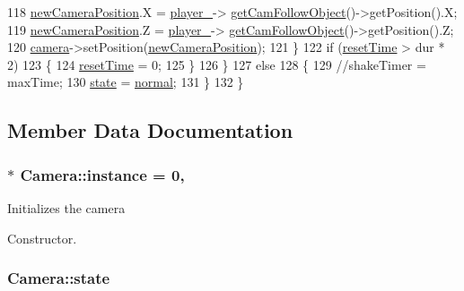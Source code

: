 \begin{DoxyCode}
118             \hyperlink{_camera_8cpp_a251c0afd6da69664ff234daccd5db458}{newCameraPosition}.X = \hyperlink{_camera_8cpp_a9aee5bc0df47d284a38a6b4da40a28a8}{player\_}->
      \hyperlink{class_player_ad41c9997bb4efcb41d8a82bf5b14c019}{getCamFollowObject}()->getPosition().X;
119             \hyperlink{_camera_8cpp_a251c0afd6da69664ff234daccd5db458}{newCameraPosition}.Z = \hyperlink{_camera_8cpp_a9aee5bc0df47d284a38a6b4da40a28a8}{player\_}->
      \hyperlink{class_player_ad41c9997bb4efcb41d8a82bf5b14c019}{getCamFollowObject}()->getPosition().Z;
120             \hyperlink{_camera_8cpp_a8920f7ea5f818f312fd7462dd96a3a50}{camera}->setPosition(\hyperlink{_camera_8cpp_a251c0afd6da69664ff234daccd5db458}{newCameraPosition});
121         \}
122         \textcolor{keywordflow}{if} (\hyperlink{_camera_8cpp_a8652745f30900067bef50ae0b81d7141}{resetTime} > dur * 2)
123         \{
124             \hyperlink{_camera_8cpp_a8652745f30900067bef50ae0b81d7141}{resetTime} = 0;
125         \}
126     \}
127     \textcolor{keywordflow}{else} 
128     \{
129         \textcolor{comment}{//shakeTimer = maxTime;}
130         \hyperlink{class_camera_a87960570c2d28bd4471c5a74fc021cb5}{state} = \hyperlink{class_camera_a1ddf5d726e6c1d1d1c08d96d42c40236abb7299ba8c5dcce883fe6987df129b1c}{normal};
131     \}
132 \}
\end{DoxyCode}


\subsection{Member Data Documentation}
\hypertarget{class_camera_af95982469bc5cdc45c48f464b9ff05b9}{
\subsubsection[{instance}]{ $\ast$ Camera\-::instance = 0\hspace{0.3cm}{\ttfamily [static]}, {\ttfamily [private]}}}\label{class_camera_af95982469bc5cdc45c48f464b9ff05b9}


Initializes the camera 

Constructor. 



 

 \hypertarget{class_camera_a87960570c2d28bd4471c5a74fc021cb5}{
\subsubsection[{state}]{ Camera\-::state}}\label{class_camera_a87960570c2d28bd4471c5a74fc021cb5}


